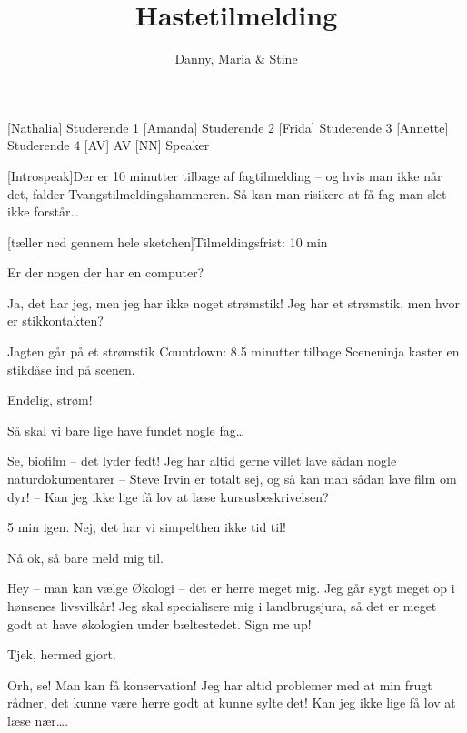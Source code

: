 \documentclass[a4paper,11pt]{article}
\title{Hastetilmelding}
\author{Danny, Maria \& Stine}
\begin{document}
\maketitle

\begin{roles}
    [Nathalia] Studerende 1
    [Amanda] Studerende 2
    [Frida] Studerende 3
    [Annette] Studerende 4
    [AV] AV
	[NN] Speaker
\end{roles}

\begin{sketch}

[Introspeak]Der er 10 minutter tilbage af fagtilmelding -- og hvis man ikke når det,  falder Tvangstilmeldingshammeren. Så kan man risikere at få fag man slet ikke forstår\ldots

[tæller ned gennem hele sketchen]Tilmeldingsfrist: 10  min

 Er der nogen der har en computer? 

 Ja, det har jeg, men jeg har ikke noget strømstik!
 Jeg har et strømstik, men hvor er stikkontakten?

\scene Jagten går på et strømstik
 Countdown: 8.5 minutter tilbage
\scene Sceneninja kaster en stikdåse ind på scenen.

 Endelig, strøm!

 Så skal vi bare lige have fundet nogle fag… 

 Se, biofilm -- det lyder fedt! Jeg har altid gerne villet lave sådan nogle naturdokumentarer -- Steve Irvin er totalt sej, og så kan man sådan lave film om dyr! -- Kan jeg ikke lige få lov at læse kursusbeskrivelsen?

 5 min igen. Nej, det har vi simpelthen ikke tid til!

 Nå ok, så bare meld mig til.

 Hey -- man kan vælge Økologi -- det er herre meget mig. Jeg går sygt meget op i hønsenes livsvilkår! Jeg skal specialisere mig i landbrugsjura, så det er meget godt at have økologien under bæltestedet. Sign me up!

 Tjek, hermed gjort. 


 Orh, se! Man kan få konservation! Jeg har altid problemer med at min frugt rådner, det kunne være herre godt at kunne sylte det! Kan jeg ikke lige få lov at læse nær….


\end{sketch}
\end{document}
